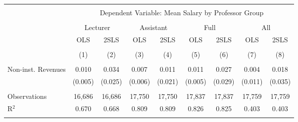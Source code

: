 
\begin{tabular}{@{\extracolsep{5pt}}lcccccccc} 
\\[-1.8ex]\hline 
\hline \\[-1.8ex] 
 & \multicolumn{8}{c}{Dependent Variable: Mean Salary by Professor Group} \\ 
\cline{2-9} 
\\[-1.8ex] & \multicolumn{2}{c}{Lecturer} & \multicolumn{2}{c}{Assistant} & \multicolumn{2}{c}{Full} & \multicolumn{2}{c}{All} \\ 
 & OLS & 2SLS & OLS & 2SLS & OLS & 2SLS & OLS & 2SLS \\ 
\\[-1.8ex] & (1) & (2) & (3) & (4) & (5) & (6) & (7) & (8)\\ 
\hline \\[-1.8ex] 
 Non-inst. Revenues & 0.010 & 0.034 & 0.007 & 0.011 & 0.011 & 0.027 & 0.004 & 0.018 \\ 
  & (0.005) & (0.025) & (0.006) & (0.021) & (0.005) & (0.029) & (0.011) & (0.035) \\ 
 \hline \\[-1.8ex] 
Observations & 16,686 & 16,686 & 17,750 & 17,750 & 17,837 & 17,837 & 17,759 & 17,759 \\ 
R$^{2}$ & 0.670 & 0.668 & 0.809 & 0.809 & 0.826 & 0.825 & 0.403 & 0.403 \\ 
\hline 
\hline \\[-1.8ex] 
\end{tabular} 
